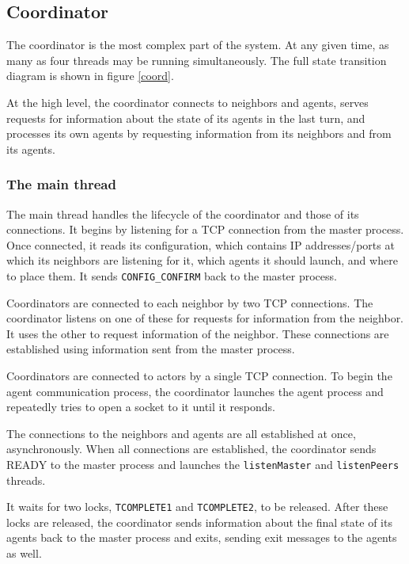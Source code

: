 \subsection{Coordinator}

The coordinator is the most complex part of the system. At any given time, as many as four threads may be running simultaneously. The full state transition diagram is shown in figure \ref{coord}.

At the high level, the coordinator connects to neighbors and agents, serves requests for information about the state of its agents in the last turn, and processes its own agents by requesting information from its neighbors and from its agents.

\subsubsection{The main thread}

The main thread handles the lifecycle of the coordinator and those of its connections. It begins by listening for a TCP connection from the master process. Once connected, it reads its configuration, which contains IP addresses/ports at which its neighbors are listening for it, which agents it should launch, and where to place them. It sends \texttt{CONFIG\_CONFIRM} back to the master process.

Coordinators are connected to each neighbor by two TCP connections. The coordinator listens on one of these for requests for information from the neighbor. It uses the other to request information of the neighbor. These connections are established using information sent from the master process.

Coordinators are connected to actors by a single TCP connection. To begin the agent communication process, the coordinator launches the agent process and repeatedly tries to open a socket to it until it responds.

The connections to the neighbors and agents are all established at once, asynchronously. When all connections are established, the coordinator sends READY to the master process and launches the \texttt{listenMaster} and \texttt{listenPeers} threads.

It waits for two locks, \texttt{TCOMPLETE1} and \texttt{TCOMPLETE2}, to be released. After these locks are released, the coordinator sends information about the final state of its agents back to the master process and exits, sending exit messages to the agents as well.

